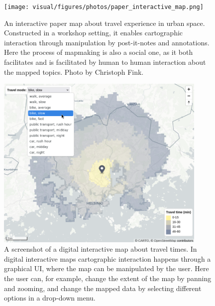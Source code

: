 \begin{figure}[H]
	\centering
	\texttt{[image: visual/figures/photos/paper\_interactive\_map.png]}
	\caption{
		An interactive paper map about travel experience in urban space.
		Constructed in a workshop setting,
		it enables cartographic interaction
		through manipulation by post-it-notes and annotations.
		Here the process of mapmaking is also a social one,
		as it both facilitates and is facilitated by
		human to human interaction about the mapped topics.
		Photo by Christoph Fink.
	}
	\label{fig:paper interactive map}
\end{figure}

\begin{figure}[H]
	\centering
	\includegraphics[width=0.9\textwidth]{visual/figures/screenshots/digital_interactive_map.png}
	\caption{
		A screenshot of a digital interactive map about travel times.
		In digital interactive maps
		cartographic interaction happens through a graphical UI,
		where the map can be manipulated by the user.
		Here the user can, for example,
		change the extent of the map by panning and zooming,
		and change the mapped data by selecting different options in a drop-down menu.
	}
	\label{fig:digital interactive map}
\end{figure}

